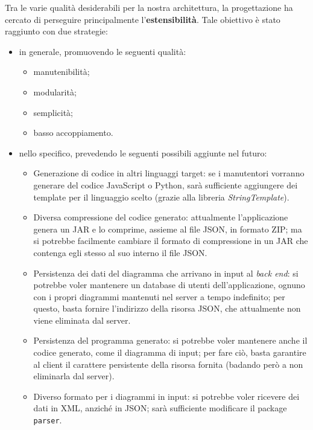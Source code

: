 Tra le varie qualità desiderabili per la nostra architettura, la progettazione ha cercato di perseguire principalmente l'\textbf{estensibilità}. Tale obiettivo è stato raggiunto con due strategie:
\begin{itemize}
	\item in generale, promuovendo le seguenti qualità:
	\begin{itemize}
		\item manutenibilità;
		\item modularità;
		\item semplicità;
		\item basso accoppiamento.
	\end{itemize}
	\item nello specifico, prevedendo le seguenti possibili aggiunte nel futuro:
	\begin{itemize}
		\item Generazione di codice in altri linguaggi target: se i manutentori vorranno generare del codice JavaScript o Python, sarà sufficiente aggiungere dei template per il linguaggio scelto (grazie alla libreria \emph{StringTemplate}).
		\item Diversa compressione del codice generato: attualmente l'applicazione genera un JAR e lo comprime, assieme al file JSON, in formato ZIP; ma si potrebbe facilmente cambiare il formato di compressione in un JAR che contenga egli stesso al suo interno il file JSON.
		\item Persistenza dei dati del diagramma che arrivano in input al \emph{back end}: si potrebbe voler mantenere un database di utenti dell'applicazione, ognuno con i propri diagrammi mantenuti nel server a tempo indefinito; per questo, basta fornire l'indirizzo della risorsa JSON, che attualmente non viene eliminata dal server. %
		\item Persistenza del programma generato: si potrebbe voler mantenere anche il codice generato, come il diagramma di input; per fare ciò, basta garantire al client il carattere persistente della risorsa fornita (badando però a non eliminarla dal server). %
		\item Diverso formato per i diagrammi in input: si potrebbe voler ricevere dei dati in XML, anziché in JSON; sarà sufficiente modificare il package \texttt{parser}.
	\end{itemize}
\end{itemize}



